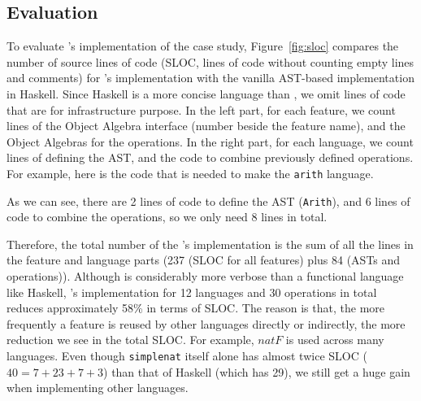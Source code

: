 
\subsection{Evaluation}

To evaluate \name's implementation of the case study, Figure~\ref{fig:sloc}
compares the number of source lines of code (SLOC, lines of code without
counting empty lines and comments) for \name's implementation with the vanilla
AST-based implementation in Haskell. Since Haskell is a more concise language
than \name, we omit lines of code that are for infrastructure purpose. In the
left part, for each feature, we count lines of the Object Algebra interface
(number beside the feature name), and the Object Algebras for the operations. In the
right part, for each language, we count lines of defining the AST, and the code
to combine previously defined operations. For example, here is the code that is
needed to make the \lstinline{arith} language.


\noindent As we can see, there are 2 lines of code to define the AST
(\lstinline{Arith}), and 6 lines of code to combine the operations, so we only
need 8 lines in total.

Therefore, the total number of the \name's implementation is the sum of all the
lines in the feature and language parts (237 (SLOC for all features) plus 84
(ASTs and operations)). Although \name is considerably more verbose than a
functional language like Haskell, \name's implementation for 12 languages and 30
operations in total reduces approximately 58\% in terms of SLOC. The reason is
that, the more frequently a feature is reused by other languages directly or
indirectly, the more reduction we see in the total SLOC. For example,
$\mathit{natF}$ is used across many languages. Even though \lstinline{simplenat}
itself alone has almost twice SLOC ($40 = 7+23+7+3$) than that of Haskell (which
has 29), we still get a huge gain when implementing other languages.



